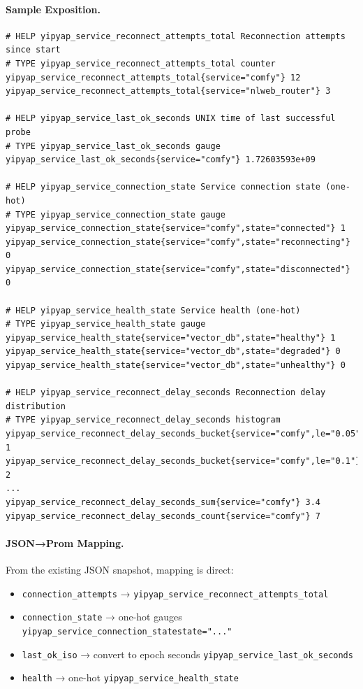 \documentclass[11pt]{article}
\begin{document}
\paragraph{Sample Exposition.}
\begin{verbatim}
# HELP yipyap_service_reconnect_attempts_total Reconnection attempts since start
# TYPE yipyap_service_reconnect_attempts_total counter
yipyap_service_reconnect_attempts_total{service="comfy"} 12
yipyap_service_reconnect_attempts_total{service="nlweb_router"} 3

# HELP yipyap_service_last_ok_seconds UNIX time of last successful probe
# TYPE yipyap_service_last_ok_seconds gauge
yipyap_service_last_ok_seconds{service="comfy"} 1.72603593e+09

# HELP yipyap_service_connection_state Service connection state (one-hot)
# TYPE yipyap_service_connection_state gauge
yipyap_service_connection_state{service="comfy",state="connected"} 1
yipyap_service_connection_state{service="comfy",state="reconnecting"} 0
yipyap_service_connection_state{service="comfy",state="disconnected"} 0

# HELP yipyap_service_health_state Service health (one-hot)
# TYPE yipyap_service_health_state gauge
yipyap_service_health_state{service="vector_db",state="healthy"} 1
yipyap_service_health_state{service="vector_db",state="degraded"} 0
yipyap_service_health_state{service="vector_db",state="unhealthy"} 0

# HELP yipyap_service_reconnect_delay_seconds Reconnection delay distribution
# TYPE yipyap_service_reconnect_delay_seconds histogram
yipyap_service_reconnect_delay_seconds_bucket{service="comfy",le="0.05"} 1
yipyap_service_reconnect_delay_seconds_bucket{service="comfy",le="0.1"} 2
...
yipyap_service_reconnect_delay_seconds_sum{service="comfy"} 3.4
yipyap_service_reconnect_delay_seconds_count{service="comfy"} 7
\end{verbatim}

\paragraph{JSON→Prom Mapping.} From the existing JSON snapshot, mapping is direct:
\begin{itemize}[nosep]
  \item \texttt{connection\_attempts} → \texttt{yipyap\_service\_reconnect\_attempts\_total}
  \item \texttt{connection\_state} → one-hot gauges \texttt{yipyap\_service\_connection\_state{state="..."}}
  \item \texttt{last\_ok\_iso} → convert to epoch seconds \texttt{yipyap\_service\_last\_ok\_seconds}
  \item \texttt{health} → one-hot \texttt{yipyap\_service\_health\_state}
\end{itemize}
\end{document}
